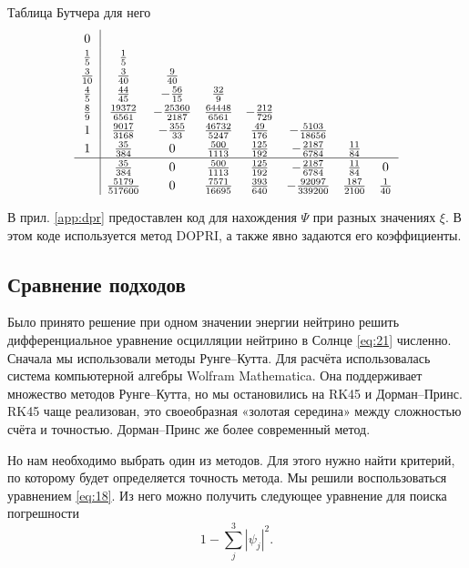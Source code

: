 \documentclass[a4paper,12pt]{article}
\begin{document}
	Таблица Бутчера для него
	 \[
	 \renewcommand\arraystretch{1.2}
	 \begin{array}
	 	{c|ccccccc}
	 	0\\
	 	\frac{1}{5} & \frac{1}{5}\\
	 	\frac{3}{10} &\frac{3}{40} &\frac{9}{40} \\
		\frac{4}{5} &\frac{44}{45} &-\frac{56}{15} &\frac{32}{9} \\
		\frac{8}{9} &\frac{19372}{6561} &-\frac{25360}{2187} &\frac{64448}{6561} &-\frac{212}{729} \\
		1&\frac{9017}{3168} &-\frac{355}{33} &\frac{46732}{5247} &\frac{49}{176} &-\frac{5103}{18656} \\
	 	1&\frac{35}{384} &0 &\frac{500}{1113} &\frac{125}{192} &-\frac{2187}{6784}&\frac{11}{84} \\
	 	\hline
		&\frac{35}{384} &0 &\frac{500}{1113} &\frac{125}{192} &-\frac{2187}{6784}&\frac{11}{84}&0 \\
	 	& \frac{5179}{517600} &0 &\frac{7571}{16695} &\frac{393}{640} &-\frac{92097}{339200} &\frac{187}{2100} &\frac{1}{40}
	 \end{array}
	 \]

	 В  прил. \ref{app:dpr} предоставлен код для нахождения \(\Psi\) при разных значениях \(\xi\). В этом коде используется метод DOPRI, а также явно задаются его коэффициенты.
	
	\subsection{Сравнение подходов}

	Было принято решение при одном значении энергии нейтрино решить дифференциальное уравнение осцилляции нейтрино в Солнце \eqref{eq:21} численно. Сначала мы использовали методы Рунге--Кутта. Для расчёта использовалась система компьютерной алгебры \textsf{Wolfram Mathematica}. Она поддерживает множество методов Рунге--Кутта, но мы остановились на RK45 и Дорман--Принс. RK45 чаще реализован, это своеобразная «золотая середина» между сложностью счёта и точностью. Дорман--Принс же более современный метод.

	Но нам необходимо выбрать один из методов. Для этого нужно найти критерий, по которому будет определяется точность метода. Мы решили воспользоваться уравнением \eqref{eq:18}. Из него можно получить следующее уравнение для поиска погрешности
	\begin{equation}\label{eq:31}
		1-\sum_{j}^{3} |\psi_{j}|^2.
	\end{equation}
\end{document}
